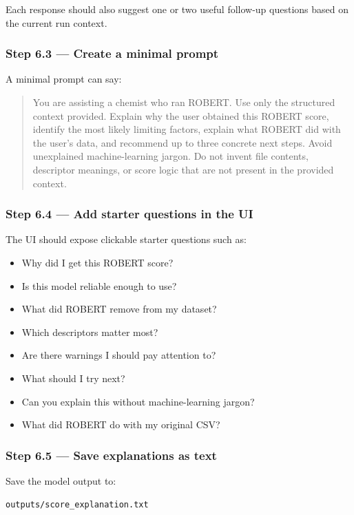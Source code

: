 \documentclass[11pt]{article}
\begin{document}
Each response should also suggest one or two useful follow-up questions based on the
current run context.

\subsubsection*{Step 6.3 --- Create a minimal prompt}
A minimal prompt can say:

\begin{quote}
You are assisting a chemist who ran ROBERT. Use only the structured context provided. Explain why the user obtained this ROBERT score, identify the most likely limiting factors, explain what ROBERT did with the user's data, and recommend up to three concrete next steps. Avoid unexplained machine-learning jargon. Do not invent file contents, descriptor meanings, or score logic that are not present in the provided context.
\end{quote}

\subsubsection*{Step 6.4 --- Add starter questions in the UI}
The UI should expose clickable starter questions such as:

\begin{itemize}
    \item Why did I get this ROBERT score?
    \item Is this model reliable enough to use?
    \item What did ROBERT remove from my dataset?
    \item Which descriptors matter most?
    \item Are there warnings I should pay attention to?
    \item What should I try next?
    \item Can you explain this without machine-learning jargon?
    \item What did ROBERT do with my original CSV?
\end{itemize}

\subsubsection*{Step 6.5 --- Save explanations as text}
Save the model output to:

\begin{verbatim}
outputs/score_explanation.txt
\end{verbatim}
\end{document}
